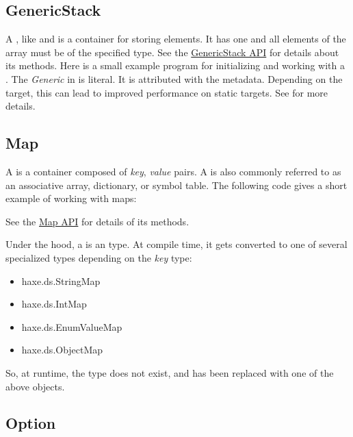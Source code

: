 \subsection{GenericStack}
\label{std-GenericStack}
A , like  and  is a container for storing elements.  It has one  and all elements of the array must be of the specified type. See the \href{http://api.haxe.org/haxe/ds/GenericStack.html}{GenericStack API} for details about its methods.  Here is a small example program for initializing and working with a .
The \emph{Generic} in  is literal.  It is attributed with the  metadata.  Depending on the target, this can lead to improved performance on static targets.  See  for more details.
\subsection{Map}
\label{std-Map}

A  is a container composed of \emph{key}, \emph{value} pairs.  A  is also commonly referred to as an associative array, dictionary, or symbol table.  The following code gives a short example of working with maps:


See the \href{http://api.haxe.org/haxe/Map.html}{Map API} for details of its methods.

Under the hood, a  is an  type.  At compile time, it gets converted to one of several specialized types depending on the \emph{key} type:
\begin{itemize}
	\item haxe.ds.StringMap
	\item haxe.ds.IntMap
	\item haxe.ds.EnumValueMap
	\item haxe.ds.ObjectMap
\end{itemize}
So, at runtime, the  type does not exist, and has been replaced with one of the above objects.  

\subsection{Option}
\label{std-Option}


